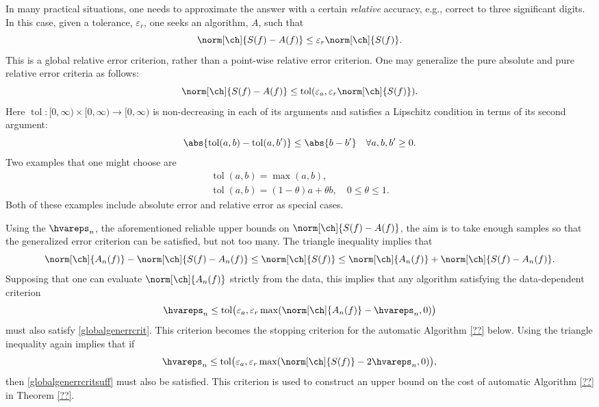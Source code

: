 \documentclass[]{elsarticle}
\DeclareMathOperator{\tol}{tol}
\theoremstyle{definition}
\theoremstyle{remark}
\begin{document}
In many practical situations, one needs to approximate the answer with a certain \emph{relative} accuracy, e.g., correct to three significant digits.  In this case, given a tolerance, $\varepsilon_r$, one seeks an algorithm, $A$, such that
\begin{equation} \label{globalrelerrcrit}
\norm[\ch]{S(f)-A(f)} \le \varepsilon_r \norm[\ch]{S(f)}.
\end{equation}
This is a global relative error criterion, rather than a point-wise relative error criterion.  One may generalize the pure absolute and pure relative error criteria as follows:
\begin{equation} \label{globalgenerrcrit}
\norm[\ch]{S(f)-A(f)} \le \tol(\varepsilon_a, \varepsilon_r \norm[\ch]{S(f)}).
\end{equation}
Here $\tol:[0,\infty) \times [0,\infty) \to [0,\infty)$ is non-decreasing in each of its arguments and satisfies a Lipschitz condition in terms of its second argument:
\begin{equation} \label{tolLip}
\abs{\tol(a,b)-\tol(a,b')} \le \abs{b-b'} \quad \forall a,b,b' \ge 0.
\end{equation}
Two examples that one might choose are 
\begin{gather} 
\label{tolspeciala}
\tol(a,b) = \max(a,b), \\ 
\label{tolspecialb}
\tol(a,b) = (1-\theta) a + \theta b, \quad 0 \le \theta \le 1.
\end{gather}
Both of these examples include absolute error and relative error as special cases. 

Using the $\hvareps_n$, the aforementioned reliable upper bounds on $\norm[\ch]{S(f)-A(f)}$, the aim is to take enough samples so that the generalized error criterion can be satisfied, but not too many.  The triangle inequality implies that
\[
\norm[\ch]{A_n(f)} - \norm[\ch]{S(f) - A_n(f)} \le \norm[\ch]{S(f)} \le \norm[\ch]{A_n(f)} + \norm[\ch]{S(f) - A_n(f)}.
\]
Supposing that one can evaluate $\norm[\ch]{A_n(f)}$ strictly from the data, this implies that any algorithm satisfying the data-dependent criterion
\begin{equation} \label{globalgenerrcritsuff}
\hvareps_n \le \tol\bigl(\varepsilon_a, \varepsilon_r \max(\norm[\ch]{A_n(f)}-\hvareps_n,0)\bigr)
\end{equation}
must also satisfy \eqref{globalgenerrcrit}.  This criterion becomes the stopping criterion for the automatic Algorithm \ref{??} below.  Using the triangle inequality again implies that if
\begin{equation} \label{globalgenerrcritsuffagain}
\hvareps_n \le \tol\bigl(\varepsilon_a, \varepsilon_r \max(\norm[\ch]{S(f)}-2\hvareps_n,0)\bigr),
\end{equation}
then \eqref{globalgenerrcritsuff} must also be satisfied.  This criterion is used to construct an upper bound on the cost of automatic Algorithm \ref{??} in Theorem \ref{??}.  
\end{document}
